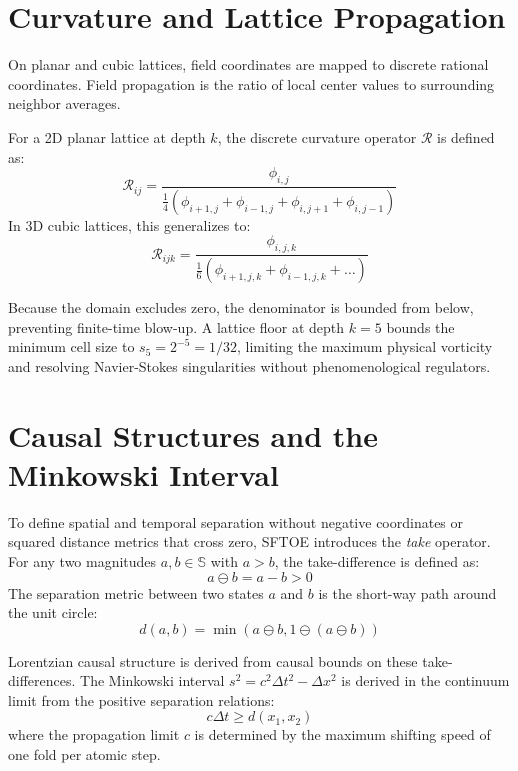 \documentclass[11pt,a4paper]{article}
\begin{document}
\section{Curvature and Lattice Propagation}
On planar and cubic lattices, field coordinates are mapped to discrete rational coordinates. Field propagation is the ratio of local center values to surrounding neighbor averages.

For a 2D planar lattice at depth $k$, the discrete curvature operator $\mathcal{R}$ is defined as:
\begin{equation}
\mathcal{R}_{ij} = \frac{\phi_{i,j}}{\frac{1}{4}(\phi_{i+1,j} + \phi_{i-1,j} + \phi_{i,j+1} + \phi_{i,j-1})}
\end{equation}
In 3D cubic lattices, this generalizes to:
\begin{equation}
\mathcal{R}_{ijk} = \frac{\phi_{i,j,k}}{\frac{1}{6}(\phi_{i+1,j,k} + \phi_{i-1,j,k} + \dots)}
\end{equation}

Because the domain excludes zero, the denominator is bounded from below, preventing finite-time blow-up. A lattice floor at depth $k=5$ bounds the minimum cell size to $s_5 = 2^{-5} = 1/32$, limiting the maximum physical vorticity and resolving Navier-Stokes singularities without phenomenological regulators.

\section{Causal Structures and the Minkowski Interval}
To define spatial and temporal separation without negative coordinates or squared distance metrics that cross zero, SFTOE introduces the \textit{take} operator. For any two magnitudes $a, b \in \mathbb{S}$ with $a > b$, the take-difference is defined as:
\begin{equation}
a \ominus b = a - b > 0
\end{equation}
The separation metric between two states $a$ and $b$ is the short-way path around the unit circle:
\begin{equation}
d(a, b) = \min(a \ominus b, 1 \ominus (a \ominus b))
\end{equation}

Lorentzian causal structure is derived from causal bounds on these take-differences. The Minkowski interval $s^2 = c^2 \Delta t^2 - \Delta x^2$ is derived in the continuum limit from the positive separation relations:
\begin{equation}
c \Delta t \ge d(x_1, x_2)
\end{equation}
where the propagation limit $c$ is determined by the maximum shifting speed of one fold per atomic step.
\end{document}
